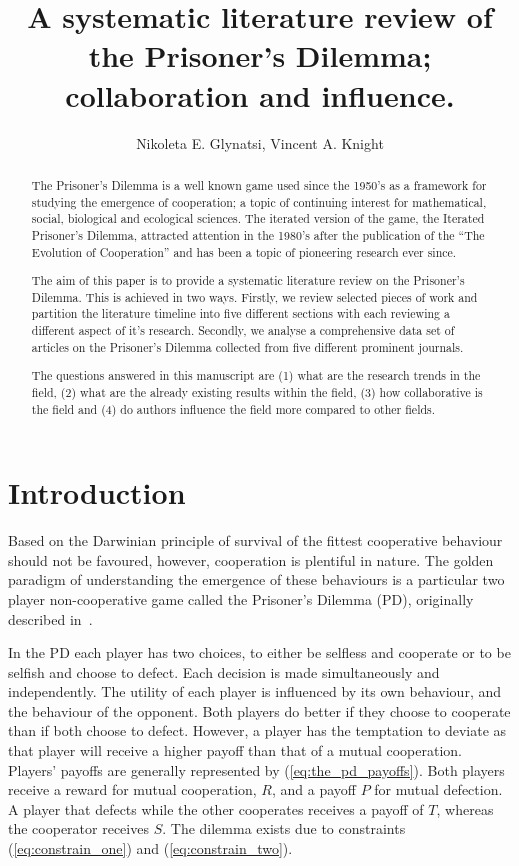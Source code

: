 \documentclass{article}
\title{A systematic literature review of the Prisoner's Dilemma; collaboration and influence.}
\author{Nikoleta E. Glynatsi, Vincent A. Knight}
\date{}
\theoremstyle{definition}
\begin{document}
\maketitle

\begin{abstract}
    The Prisoner's Dilemma is a well known game used since the 1950's as a
    framework for studying the emergence of cooperation; a topic of continuing
    interest for mathematical, social, biological and ecological sciences. The
    iterated version of the game, the Iterated Prisoner's Dilemma, attracted
    attention in the 1980's after the publication of the ``The Evolution of
    Cooperation'' and has been a topic of pioneering research ever since.

    The aim of this paper is to provide a systematic literature review on the
    Prisoner's Dilemma. This is achieved in two ways.
    Firstly, we review selected pieces of work and partition the literature
    timeline into five different sections with each reviewing a different
    aspect of it's research. Secondly, we
    analyse a comprehensive data set of articles on the
    Prisoner's Dilemma collected from five different prominent journals.

    The questions answered in this manuscript are (1) what are the research trends
    in the field, (2) what are the already existing results within the field,
    (3) how collaborative is the field and (4) do authors influence the field more
    compared to other fields.
\end{abstract}

\section{Introduction}\label{section:introduction}

Based on the Darwinian principle of survival of the fittest cooperative behaviour
should not be favoured, however, cooperation is plentiful in nature.
The golden paradigm of understanding the emergence of these behaviours is
a particular two player non-cooperative game called the Prisoner's Dilemma (PD),
originally described in~\cite{Flood1958}.

In the PD each player has two choices, to either be selfless and cooperate or to
be selfish and choose to defect. Each decision is made simultaneously and
independently. The utility of each player is influenced by its own behaviour,
and the behaviour of the opponent. Both players do better if they choose to
cooperate than if both choose to defect. However, a player has the temptation to
deviate as that player will receive a higher payoff than that of a mutual
cooperation.
Players' payoffs are generally represented by (\ref{eq:the_pd_payoffs}). Both
players receive a reward for mutual cooperation, \(R\), and a payoff \(P\) for
mutual defection. A player that defects while the other cooperates receives a payoff of
\(T\), whereas the cooperator receives \(S\). The dilemma exists due
to constraints (\ref{eq:constrain_one}) and (\ref{eq:constrain_two}).
\end{document}
